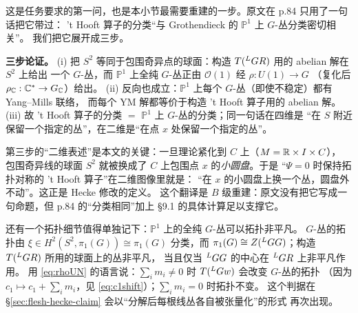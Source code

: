 这是任务要求的第一问，也是本小节最需要重建的一步。原文在 p.84 只用了一句话把它带过：
't Hooft{} 算子的分类“与 Grothendieck 的 $\mathbb{P}^1$ 上 $G$-丛分类密切相关”。
我们把它展开成三步。

\begin{keyidea}
\textbf{三步论证。}
(i) 把 $S^2$ 等同于包围奇异点的球面：构造 $T({}^{L}G R)$ 用的 abelian 解在 $S^2$ 上给出
一个 $G$-丛，而 $\mathbb{P}^1$ 上全纯 $G$-丛正由 $\mathcal{O}(1)$ 经 $\rho:U(1)\to G$
（复化后 $\rho_{\mathbb{C}}:\mathbb{C}^*\to G_{\mathbb{C}}$）给出。\pA{}
(ii) 反向也成立：$\mathbb{P}^1$ 上每个 $G$-丛（即使不稳定）都有 Yang--Mills 联络，
而每个 YM 解都等价于构造 't Hooft{} 算子用的 abelian 解。\pA{}
(iii) 故 't Hooft{} 算子的分类 $=$ $\mathbb{P}^1$ 上 $G$-丛的分类；同一句话在四维是
“在 $S$ 附近保留一个指定的丛”，在二维是“在点 $x$ 处保留一个指定的丛”。
\pA{}
\end{keyidea}

第三步的“二维表述”是本文的关键：一旦理论紧化到 $C$ 上（$M=\mathbb{R}\times I\times C$），
包围奇异线的球面 $S^2$ 就被换成了 $C$ 上包围点 $x$ 的\emph{小圆盘}。于是
“$\Psi=0$ 时保持拓扑对称的 't Hooft{} 算子”在二维图像里就是：
“在 $x$ 的小圆盘上换一个丛，圆盘外不动”。这正是 Hecke 修改的定义。
这个翻译是 $B$ 级重建：原文没有把它写成一句命题，但 p.84 的“分类相同”加上
§9.1 的具体计算足以支撑它。\pB{}

还有一个拓扑细节值得单独记下：$\mathbb{P}^1$ 上的全纯 $G$-丛可以拓扑非平凡。
$G$-丛的拓扑由 $\xi\in H^2(S^2,\pi_1(G))\cong\pi_1(G)$ 分类，而
$\pi_1(G)\cong Z({}^{L}G G)$；构造 $T({}^{L}G R)$ 所用的球面上的丛非平凡，
当且仅当 ${}^{L}G G$ 的中心在 ${}^{L}G R$ 上非平凡作用。\pA{}
用 \eqref{eq:rhoUN} 的语言说：$\sum_i m_i\ne 0$ 时 $T({}^{L}G w)$ 会改变 $G$-丛的拓扑
（因为 $c_1\mapsto c_1+\sum_i m_i$，见 \eqref{eq:c1shift}）；$\sum_i m_i=0$ 时拓扑不变。
这个判据在 §\ref{sec:flesh-hecke-claim} 会以“分解后每根线丛各自被张量化”的形式
再次出现。\pB{}

